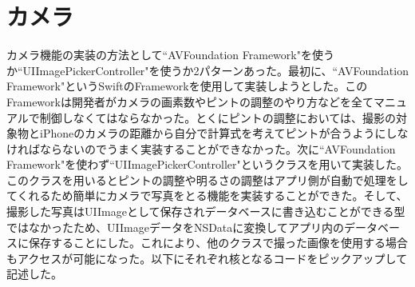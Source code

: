 \section{カメラ}
カメラ機能の実装の方法として``AVFoundation Framework"を使うか``UIImagePickerController"を使うか2パターンあった。最初に、``AVFoundation Framework"というSwiftのFrameworkを使用して実装しようとした。このFrameworkは開発者がカメラの画素数やピントの調整のやり方などを全てマニュアルで制御しなくてはならなかった。とくにピントの調整においては、撮影の対象物とiPhoneのカメラの距離から自分で計算式を考えてピントが合うようにしなければならないのでうまく実装することができなかった。次に``AVFoundation Framework"を使わず``UIImagePickerController"というクラスを用いて実装した。このクラスを用いるとピントの調整や明るさの調整はアプリ側が自動で処理をしてくれるため簡単にカメラで写真をとる機能を実装することができた。そして、撮影した写真はUIImageとして保存されデータベースに書き込むことができる型ではなかったため、UIImageデータをNSDataに変換してアプリ内のデータベースに保存することにした。これにより、他のクラスで撮った画像を使用する場合もアクセスが可能になった。以下にそれぞれ核となるコードをピックアップして記述した。

